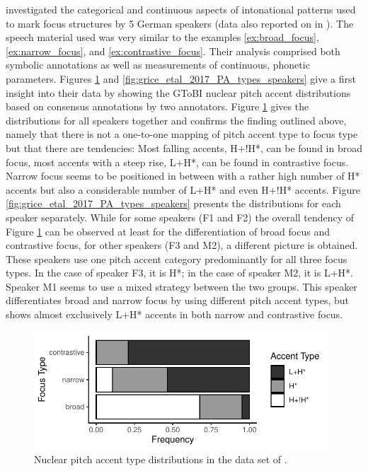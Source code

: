 \citet{Griceetal2017} investigated the categorical and continuous aspects of intonational patterns used to mark focus structures by 5 German speakers (data also reported on in \citealp{MückeGrice2014}). The speech material used was very similar to the examples \ref{ex:broad_focus}, \ref{ex:narrow_focus}, and \ref{ex:contrastive_focus}. Their analysis comprised both symbolic annotations as well as measurements of continuous, phonetic parameters. Figures \ref{fig:grice_etal_2017_PA_types} and \ref{fig:grice_etal_2017_PA_types_speakers} give a first insight into their data by showing the GToBI nuclear pitch accent distributions based on consensus annotations by two annotators. Figure \ref{fig:grice_etal_2017_PA_types} gives the distributions for all speakers together and confirms the finding outlined above, namely that there is not a one-to-one mapping of pitch accent type to focus type but that there are tendencies: Most falling accents, H+!H*, can be found in broad focus, most accents with a steep rise, L+H*, can be found in contrastive focus. Narrow focus seems to be positioned in between with a rather high number of H* accents but also a considerable number of L+H* and even H+!H* accents. Figure \ref{fig:grice_etal_2017_PA_types_speakers} presents the distributions for each speaker separately. While for some speakers (F1 and F2) the overall tendency of Figure \ref{fig:grice_etal_2017_PA_types} can be observed at least for the differentiation of broad focus and contrastive focus, for other speakers (F3 and M2), a different picture is obtained. These speakers use one pitch accent category predominantly for all three focus types. In the case of speaker F3, it is H*; in the case of speaker M2, it is L+H*. Speaker M1 seems to use a mixed strategy between the two groups. This speaker differentiates broad and narrow focus by using different pitch accent types, but shows almost exclusively L+H* accents in both narrow and contrastive focus.

\begin{figure}[t]
\includegraphics[width=11cm]{figures/ch4/Grice_etal_PA_Types.pdf}
\caption{Nuclear pitch accent type distributions in the data set of \citet{Griceetal2017}.}
\label{fig:grice_etal_2017_PA_types}
\end{figure}


